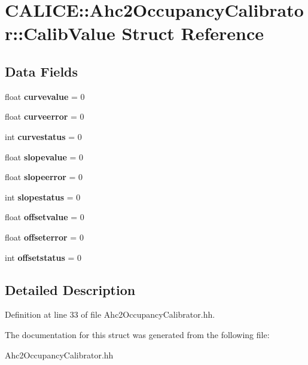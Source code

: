 \section{C\-A\-L\-I\-C\-E\-:\-:Ahc2\-Occupancy\-Calibrator\-:\-:Calib\-Value Struct Reference}
\label{structCALICE_1_1Ahc2OccupancyCalibrator_1_1CalibValue}
\subsection*{Data Fields}
\begin{DoxyCompactItemize}
\item 
float {\bfseries curvevalue} = 0\label{structCALICE_1_1Ahc2OccupancyCalibrator_1_1CalibValue_a05abe7308efcf8c0e39113f9b1c03a8d}

\item 
float {\bfseries curveerror} = 0\label{structCALICE_1_1Ahc2OccupancyCalibrator_1_1CalibValue_ad9aba8d90278a789a3398e091074eec5}

\item 
int {\bfseries curvestatus} = 0\label{structCALICE_1_1Ahc2OccupancyCalibrator_1_1CalibValue_a7915d6f4b2a92d20b11b9ca0da61dc95}

\item 
float {\bfseries slopevalue} = 0\label{structCALICE_1_1Ahc2OccupancyCalibrator_1_1CalibValue_ac9b5c79dadc8f4e3effecf08310e4112}

\item 
float {\bfseries slopeerror} = 0\label{structCALICE_1_1Ahc2OccupancyCalibrator_1_1CalibValue_ae49bc5855c4a056da816d952044f6238}

\item 
int {\bfseries slopestatus} = 0\label{structCALICE_1_1Ahc2OccupancyCalibrator_1_1CalibValue_ae1f6e313a4697e23cc2e22a786be58c9}

\item 
float {\bfseries offsetvalue} = 0\label{structCALICE_1_1Ahc2OccupancyCalibrator_1_1CalibValue_acbc5f70702617aa762f4471b404390be}

\item 
float {\bfseries offseterror} = 0\label{structCALICE_1_1Ahc2OccupancyCalibrator_1_1CalibValue_a7f9c7dd738a14b51e9f70110a3d364d8}

\item 
int {\bfseries offsetstatus} = 0\label{structCALICE_1_1Ahc2OccupancyCalibrator_1_1CalibValue_ad3adf926b299644dcd21989733d14a7e}

\end{DoxyCompactItemize}


\subsection{Detailed Description}


Definition at line 33 of file Ahc2\-Occupancy\-Calibrator.\-hh.



The documentation for this struct was generated from the following file\-:\begin{DoxyCompactItemize}
\item 
Ahc2\-Occupancy\-Calibrator.\-hh\end{DoxyCompactItemize}

